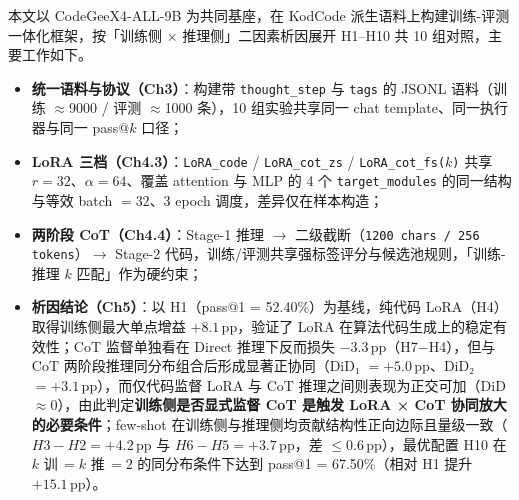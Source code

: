 
本文以 CodeGeeX4-ALL-9B 为共同基座，在 KodCode 派生语料上构建训练-评测一体化框架，按「训练侧 $\times$ 推理侧」二因素析因展开 H1--H10 共 10 组对照，主要工作如下。

\begin{itemize}
    \item \textbf{统一语料与协议（Ch3）}：构建带 \texttt{thought\_step} 与 \texttt{tags} 的 JSONL 语料（训练 $\approx$9000 / 评测 $\approx$1000 条），10 组实验共享同一 chat template、同一执行器与同一 pass@$k$ 口径；
    \item \textbf{LoRA 三档（Ch4.3）}：\texttt{LoRA\_code} / \texttt{LoRA\_cot\_zs} / \texttt{LoRA\_cot\_fs($k$)} 共享 $r{=}32$、$\alpha{=}64$、覆盖 attention 与 MLP 的 4 个 \texttt{target\_modules} 的同一结构与等效 batch $=32$、3 epoch 调度，差异仅在样本构造；
    \item \textbf{两阶段 CoT（Ch4.4）}：Stage-1 推理 $\to$ 二级截断（\texttt{1200 chars / 256 tokens}）$\to$ Stage-2 代码，训练/评测共享强标签评分与候选池规则，「训练-推理 $k$ 匹配」作为硬约束；
    \item \textbf{析因结论（Ch5）}：以 H1（pass@1 = 52.40\%）为基线，纯代码 LoRA（H4）取得训练侧最大单点增益 $+8.1$\,pp，验证了 LoRA 在算法代码生成上的稳定有效性；CoT 监督单独看在 Direct 推理下反而损失 $-3.3$\,pp（H7$-$H4），但与 CoT 两阶段推理同分布组合后形成显著正协同（DiD₁ $= +5.0$\,pp、DiD₂ $= +3.1$\,pp），而仅代码监督 LoRA 与 CoT 推理之间则表现为正交可加（DiD $\approx 0$），由此判定\textbf{训练侧是否显式监督 CoT 是触发 LoRA × CoT 协同放大的必要条件}；few-shot 在训练侧与推理侧均贡献结构性正向边际且量级一致（$H3-H2 = +4.2$\,pp 与 $H6-H5 = +3.7$\,pp，差 $\le 0.6$\,pp），最优配置 H10 在 $k$ 训\,$=k$ 推\,$=2$ 的同分布条件下达到 pass@1 = 67.50\%（相对 H1 提升 $+15.1$\,pp）。
\end{itemize}